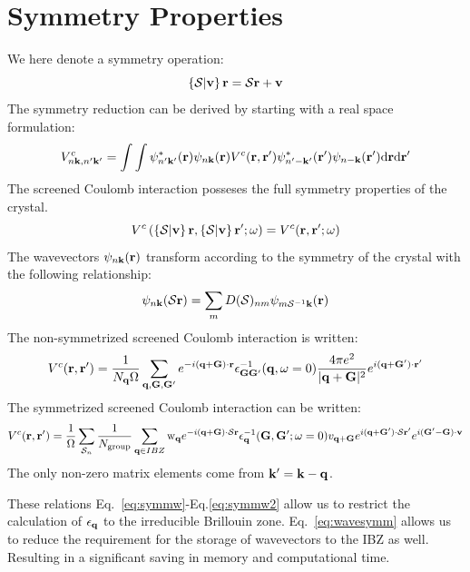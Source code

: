 \section{Symmetry Properties}
%
We here denote a symmetry operation:
%
\begin{equation}
  \label{eq:symmoperation}
  \left\{\mathcal{S}|\mathbf{v}\right\}{\bf r} = \mathcal{S}{\bf r} + \mathbf{v}
\end{equation}
%
The symmetry reduction can be derived by starting with a real space formulation:
%
\begin{equation}
\label{eq:vcmatel}
V^{c}_{n{\bf k},n'{\bf k}'} = \int \int \psi^{*}_{n'{\bf k}'}({\bf r})\psi_{n{\bf k}}({\bf r})V^{c}({\bf r},{\bf r}')\psi^{*}_{n'-{\bf k}'}({\bf r}')\psi_{n-{\bf k}}({\bf r}')\rm{d}{\bf r} \rm{d}{\bf r}'
\end{equation}
%
The screened Coulomb interaction posseses the full symmetry properties of the crystal.
%
\begin{equation}
\label{eq:symmw}
V^{c}\left(\left\{\mathcal{S}|\mathbf{v}\right\}{\bf r},\left\{\mathcal{S}|\mathbf{v}\right\}{\bf r^\prime};\omega\right) = V^{c}({\bf r},{\bf r^\prime};\omega)
\end{equation}
%
The wavevectors $\psi_{n{\bf k}}({\bf r})$ transform according to the symmetry of the crystal
with the following relationship:
%
\begin{equation}
\label{eq:wavesymm}
\psi_{n{\bf k}}(\mathcal{S}{\bf r}) = \sum_{m} D(\mathcal{S})_{nm} \psi_{m\mathcal{S}^{-1}{\bf k}}({\bf r})
\end{equation}
%
The non-symmetrized screened Coulomb interaction is written:
%
\begin{equation}
V^{c}({\bf r},{\bf r}') = \frac{1}{N_{{\bf q}}\Omega}\sum_{{\bf q},{\bf G},{\bf G}'}e^{-i({\bf q}+{\bf G})\cdot{\bf r}} \epsilon^{-1}_{{\bf G}{\bf G}'}({\bf q},\omega=0)\frac{4\pi e^{2}}{|{\bf q}+{\bf G}|^{2}} e^{i({\bf q}+{\bf G}')\cdot{\bf r}'}
\end{equation}
%
The symmetrized screened Coulomb interaction can be written:
%
\begin{equation}
\label{eq:symmw2}
V^{c}({\bf r},{\bf r}') = \frac{1}{\Omega}\sum_{\mathcal{S}_{n}}\frac{1}{N_{\rm group}}\sum_{{\bf q}\in IBZ}{\rm w_{{\bf q}}}e^{-i({\bf q}+{\bf G})\cdot\mathcal{S}{\bf r}}\epsilon^{-1}_{{\bf q}}({\bf G},{\bf G}';\omega=0)v_{{\bf q}+{\bf G}}e^{i({\bf q}+{\bf G}')\cdot\mathcal{S}{\bf r}'}e^{i({\bf G}'-{\bf G})\cdot\mathbf{v}}
\end{equation}
%
The only non-zero matrix elements come from ${\bf k}'={\bf k}-{\bf q}$.

These relations Eq.~\ref{eq:symmw}-Eq.\ref{eq:symmw2} allow 
us to restrict the calculation of $\epsilon_{{\bf q}}$ to the irreducible
Brillouin zone. Eq.~\ref{eq:wavesymm} allows us to 
reduce the requirement for the storage of
wavevectors to the IBZ as well. Resulting in a significant 
saving in memory and computational time.

